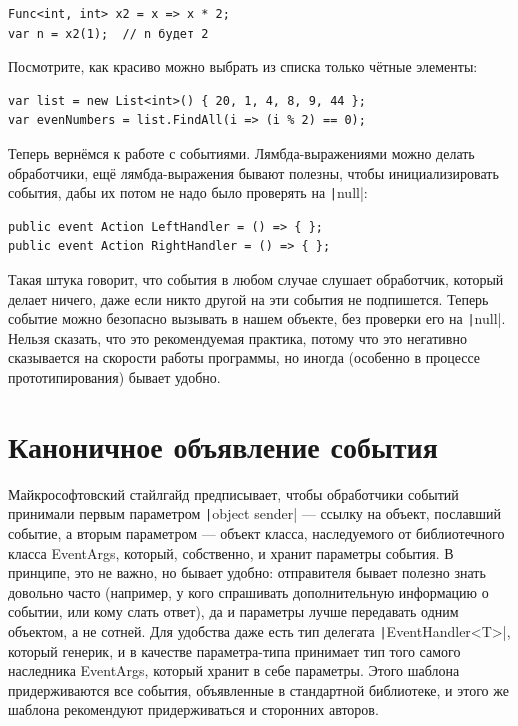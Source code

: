 \documentclass[a5paper]{article}
\begin{document}
\begin{verbatim}
Func<int, int> x2 = x => x * 2;
var n = x2(1);  // n будет 2
\end{verbatim}

Посмотрите, как красиво можно выбрать из списка только чётные элементы:

\begin{verbatim}
var list = new List<int>() { 20, 1, 4, 8, 9, 44 };
var evenNumbers = list.FindAll(i => (i % 2) == 0);
\end{verbatim}

Теперь вернёмся к работе с событиями. Лямбда-выражениями можно делать обработчики, ещё лямбда-выражения бывают полезны, чтобы инициализировать события, дабы их потом не надо было проверять на \texttt|null|:

\begin{verbatim}
public event Action LeftHandler = () => { };
public event Action RightHandler = () => { };
\end{verbatim}

Такая штука говорит, что события в любом случае слушает обработчик, который делает ничего, даже если никто другой на эти события не подпишется. Теперь событие можно безопасно вызывать в нашем объекте, без проверки его на \texttt|null|. Нельзя сказать, что это рекомендуемая практика, потому что это негативно сказывается на скорости работы программы, но иногда (особенно в процессе прототипирования) бывает удобно.

\section{Каноничное объявление события}

Майкрософтовский стайлгайд предписывает, чтобы обработчики событий принимали первым параметром \texttt|object sender| --- ссылку на объект, пославший событие, а вторым параметром --- объект класса, наследуемого от библиотечного класса EventArgs, который, собственно, и хранит параметры события. В принципе, это не важно, но бывает удобно: отправителя бывает полезно знать довольно часто (например, у кого спрашивать дополнительную информацию о событии, или кому слать ответ), да и параметры лучше передавать одним объектом, а не сотней. Для удобства даже есть тип делегата \texttt|EventHandler<T>|, который генерик, и в качестве параметра-типа принимает тип того самого наследника EventArgs, который хранит в себе параметры. Этого шаблона придерживаются все события, объявленные в стандартной библиотеке, и этого же шаблона рекомендуют придерживаться и сторонних авторов.
\end{document}
